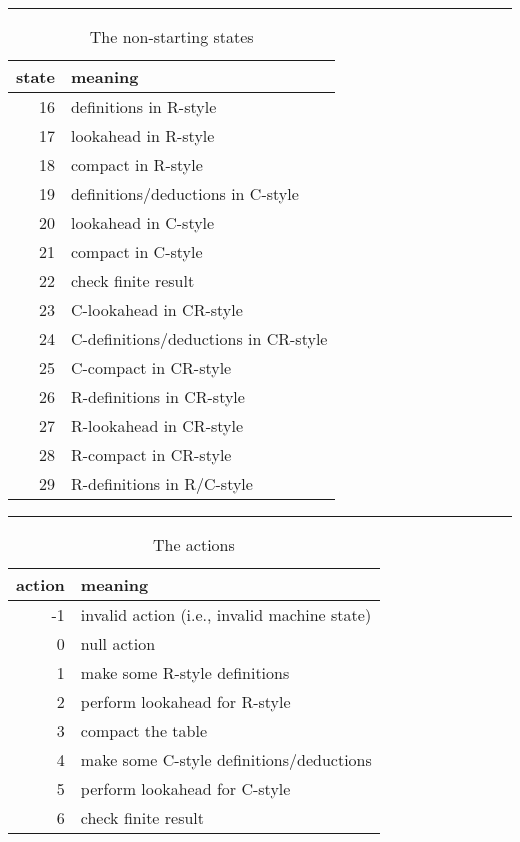 \begin{table}
\hrule
\caption{The non-starting states}
\label{tab:phase}
\smallskip
\renewcommand{\arraystretch}{0.85}
\begin{tabular*}{\textwidth}{@{\extracolsep{\fill}}rl} 
\hline\hline
state & meaning \\
\hline
16 & definitions in R-style \\
17 & lookahead in R-style \\
18 & compact in R-style \\
19 & definitions/deductions in C-style \\
20 & lookahead in C-style \\
21 & compact in C-style \\
22 & check finite result \\
23 & C-lookahead in CR-style \\
24 & C-definitions/deductions in CR-style \\
25 & C-compact in CR-style \\
26 & R-definitions in CR-style \\
27 & R-lookahead in CR-style \\
28 & R-compact in CR-style \\
29 & R-definitions in R/C-style \\
\hline\hline
\end{tabular*}
\end{table}

\begin{table}
\hrule
\caption{The actions}
\label{tab:action}
\smallskip
\renewcommand{\arraystretch}{0.85}
\begin{tabular*}{\textwidth}{@{\extracolsep{\fill}}rl} 
\hline\hline
action & meaning \\
\hline
-1 & invalid action (i.e., invalid machine state)\\
0  & null action \\
1  & make some R-style definitions \\
2  & perform lookahead for R-style \\
3  & compact the table \\
4  & make some C-style definitions/deductions \\
5  & perform lookahead for C-style \\
6  & check finite result \\
\hline\hline
\end{tabular*}
\end{table}

